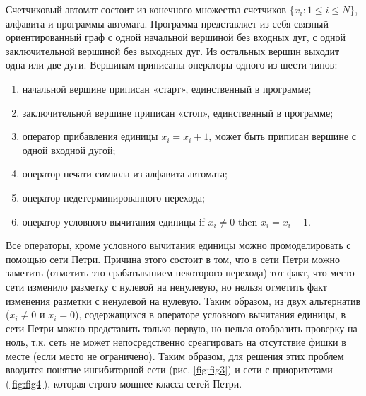 Счетчиковый автомат состоит из конечного множества счетчиков $ \{ x_{i} : 1 \leq i \leq N \} $, алфавита и программы автомата. Программа представляет из себя связный ориентированный граф с одной начальной вершиной без входных дуг, с одной заключительной вершиной без выходных дуг. Из остальных вершин выходит одна или две дуги. Вершинам приписаны операторы одного из шести типов:
\begin{enumerate}
\item начальной вершине приписан «старт», единственный в программе;
\item заключительной вершине приписан «стоп», единственный в программе;
\item оператор прибавления единицы $ x_{i} = x_{i} + 1 $, может быть приписан вершине с одной входной дугой;
\item оператор печати символа из алфавита автомата;
\item оператор недетерминированного перехода;
\item оператор условного вычитания единицы if $ x_{i} \neq 0 $ then $ x_{i} = x_{i} - 1 $.
\end{enumerate}

Все операторы, кроме условного вычитания единицы можно промоделировать с помощью сети Петри. Причина этого состоит в том, что в сети Петри можно заметить (отметить это срабатыванием некоторого перехода) тот факт, что место сети изменило разметку с нулевой на ненулевую, но нельзя отметить факт изменения разметки с ненулевой на нулевую. Таким образом, из двух альтернатив ($ x_{i} \neq 0 $ и $ x_{i} = 0 $), содержащихся в операторе условного вычитания единицы, в сети Петри можно представить только первую, но нельзя отобразить проверку на ноль, т.к. сеть не может непосредственно среагировать на отсутствие фишки в месте (если место не ограничено).\cite{Piterson} Таким образом, для решения этих проблем вводится понятие ингибиторной сети (рис. \ref{fig:fig3}) и сети с приоритетами (\ref{fig:fig4}), которая строго мощнее класса сетей Петри. 

